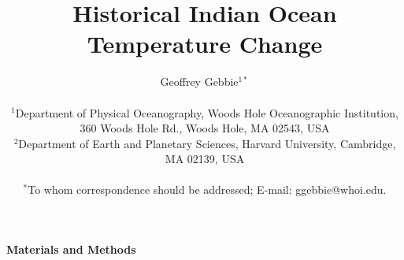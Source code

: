 \documentclass[12pt]{article}
\title{Historical Indian Ocean Temperature Change}
\author
{Geoffrey Gebbie$^{1\ast}$ \\
\\
\normalsize{$^{1}$Department of Physical Oceanography, Woods Hole Oceanographic Institution,}\\
\normalsize{360 Woods Hole Rd., Woods Hole, MA 02543, USA}\\
\normalsize{$^{2}$Department of Earth and Planetary Sciences, Harvard University, Cambridge, MA 02139, USA}\\
\\
\normalsize{$^\ast$To whom correspondence should be addressed; E-mail:  ggebbie@whoi.edu.}
}
\date{}
\newenvironment{sciabstract}{%
\begin{quote} \bf}
{\end{quote}}
\begin{document}
 


\baselineskip24pt


\maketitle 


\begin{sciabstract}
\end{sciabstract}


{\bf {\Large Materials and Methods}}
\end{document}
